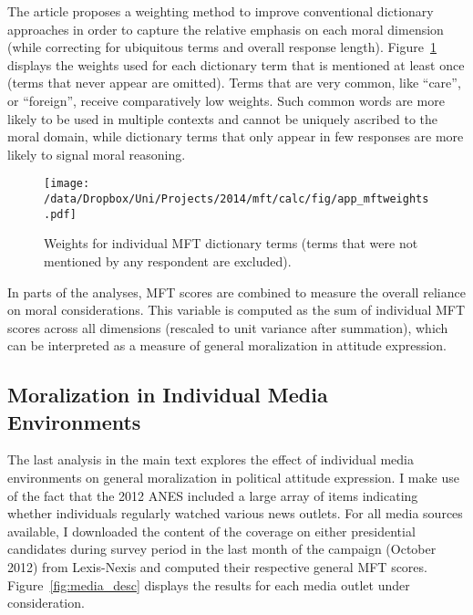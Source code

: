 The article proposes a weighting method to improve conventional dictionary approaches in order to capture the relative emphasis on each moral dimension (while correcting for ubiquitous terms and overall response length). Figure~\ref{fig:mft_weights} displays the weights used for each dictionary term that is mentioned at least once (terms that never appear are omitted). Terms that are very common, like ``care'', or ``foreign'', receive comparatively low weights. Such common words are more likely to be used in multiple contexts and cannot be uniquely ascribed to the moral domain, while dictionary terms that only appear in few responses are more likely to signal moral reasoning.

\begin{figure}[ht]\centering
\texttt{[image: /data/Dropbox/Uni/Projects/2014/mft/calc/fig/app\_mftweights.pdf]}
\caption[Weights for individual MFT dictionary terms]{Weights for individual MFT dictionary terms (terms that were not mentioned by any respondent are excluded).}\label{fig:mft_weights}
\end{figure}

In parts of the analyses, MFT scores are combined to measure the overall reliance on moral considerations. This variable is computed as the sum of individual MFT scores across all dimensions (rescaled to unit variance after summation), which can be interpreted as a measure of general moralization in attitude expression.


\clearpage
\subsection{Moralization in Individual Media Environments}\label{app:media}

The last analysis in the main text explores the effect of individual media environments on general moralization in political attitude expression. I make use of the fact that the 2012 ANES included a large array of items indicating whether individuals regularly watched various news outlets. For all media sources available, I downloaded the content of the coverage on either presidential candidates during survey period in the last month of the campaign (October 2012) from Lexis-Nexis and computed their respective general MFT scores. Figure~\ref{fig:media_desc} displays the results for each media outlet under consideration.

